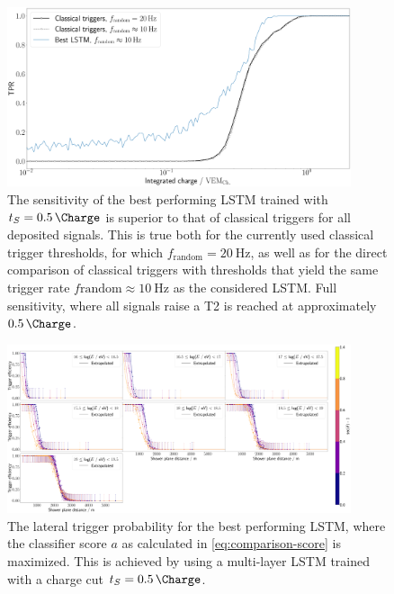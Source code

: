\begin{figure}
	\centering
	\includegraphics[width=0.9\textwidth]{./plots/LSTM_charge_TPR.png}
	\caption{The sensitivity of the best performing LSTM trained with $t_S = \SI{0.5}{\Charge}$ is superior to that of classical triggers for all deposited 
	signals. This is true both for the currently used classical trigger thresholds, for which $f_\text{random} = \SI{20}{\hertz}$, as well as for the direct 
	comparison of classical triggers with thresholds that yield the same trigger rate $f\text{random} \approx \SI{10}{\hertz}$ as the considered LSTM. Full 
	sensitivity, where all signals raise a T2 is reached at approximately $\SI{0.5}{\Charge}$.}
	\label{fig:LSTM-charge-TPR}
\end{figure}

\begin{figure}
	\centering
	\includegraphics[width=0.9\textwidth]{./plots/LSTM_LTP.png}
	\caption{The lateral trigger probability for the best performing LSTM, where the classifier score $a$ as calculated in \autoref{eq:comparison-score} is 
	maximized. This is achieved by using a multi-layer LSTM trained with a charge cut $t_S = \SI{0.5}{\Charge}$.}
	\label{fig:LSTM-LTP}
\end{figure}

